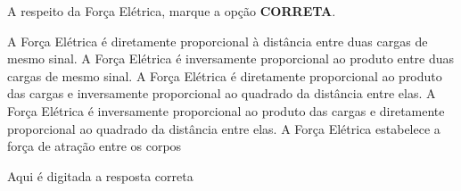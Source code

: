 \question [20] A respeito da Força Elétrica, marque a opção {\bf CORRETA}.  

	\begin{EnvUplevel}
		\begin{choices}
		\choice A Força Elétrica é diretamente proporcional à distância entre duas cargas de mesmo sinal.     
		\choice A Força Elétrica é inversamente proporcional ao produto entre duas cargas de mesmo sinal.     
		\correctchoice A Força Elétrica é diretamente proporcional ao produto das cargas e inversamente proporcional ao quadrado da distância entre elas.        
		\choice A Força Elétrica é inversamente proporcional ao produto das cargas e diretamente proporcional ao quadrado da distância entre elas.           
		\choice A Força Elétrica estabelece a força de atração entre os corpos
		\end{choices}
	\end{EnvUplevel}
	
		\begin{EnvUplevel}
		\begin{solution}
		Aqui é digitada a resposta correta
		\end{solution}
		\end{EnvUplevel}

	
